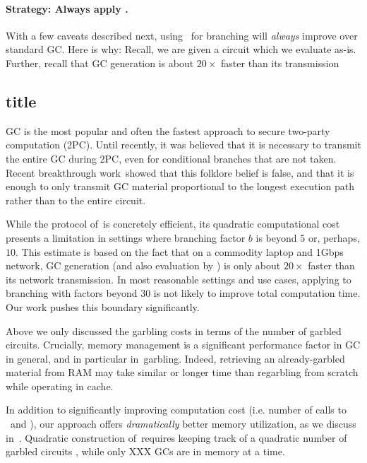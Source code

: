 \paragraph{Strategy: Always apply \ourscheme.}  With a few caveats described next, using \ourscheme\ for branching will {\em always} improve over standard GC.  Here is why:  Recall, we are given a circuit \cir which we  evaluate as-is.  Further, recall that GC generation is about $20\times$ faster than its transmission 


\subsection{title}

GC is the most popular and often the fastest approach to secure two-party computation
(2PC).  Until recently, it was believed that it is necessary
to transmit the entire GC during 2PC, even for conditional branches that
are not taken.  Recent breakthrough work~\HK showed that this folklore belief is false, and that  it is enough to only transmit GC material  proportional to the
longest execution path rather than to the entire circuit.

While the protocol of~\HK is concretely efficient, its quadratic computational cost presents a  limitation in settings where branching factor $b$ is beyond $5$ or, perhaps, $10$.  This estimate is based on the fact that on a commodity laptop and 1Gbps network, GC generation (and also evaluation by \E) is only about $20\times$ faster than its network transmission.  In most reasonable  settings and use cases, applying \HK to branching with factors beyond $30$ is not likely to improve total computation time.  Our work pushes this boundary significantly.

Above we only discussed the garbling costs in terms of the number of garbled circuits.  Crucially, memory management is a significant performance factor in GC in general, and in particular in~\HK garbling.  Indeed, retrieving an already-garbled material from RAM may take similar or longer time than regarbling from scratch while operating in cache.

In addition to significantly improving computation cost (i.e. number of calls to \Gb\ and \Ev), our approach offers {\em dramatically} better memory utilization, as we discuss in~.  Quadratic construction of~\HK requires keeping track of a quadratic number of garbled circuits , while only XXX GCs are in memory at a time.  

